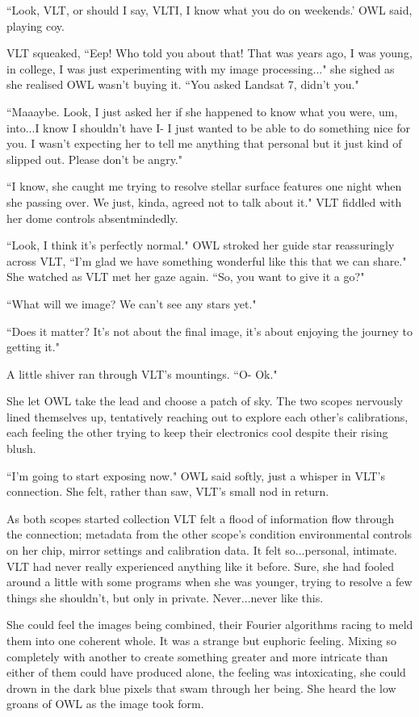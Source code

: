 \documentclass[12pt]{iopart}
\begin{document}
``Look, VLT, or should I say, VLTI, I know what you do on weekends.' OWL said, playing coy.

VLT squeaked, ``Eep! Who told you about that! That was years ago, I was young, in college, I was just experimenting with my image processing..." she sighed as she realised OWL wasn't buying it. ``You asked Landsat 7, didn't you."

``Maaaybe. Look, I just asked her if she happened to know what you were, um, into...I know I shouldn't have I- I just wanted to be able to do something nice for you. I wasn't expecting her to tell me anything that personal but it just kind of slipped out. Please don't be angry."

``I know, she caught me trying to resolve stellar surface features one night when she passing over. We just, kinda, agreed not to talk about it." VLT fiddled with her dome controls absentmindedly.

``Look, I think it's perfectly normal." OWL stroked her guide star reassuringly across VLT, ``I'm glad we have something wonderful like this that we can share." She watched as VLT met her gaze again. ``So, you want to give it a go?"

``What will we image? We can't see any stars yet."

``Does it matter? It's not about the final image, it's about enjoying the journey to getting it."

A little shiver ran through VLT's mountings. ``O- Ok."

She let OWL take the lead and choose a patch of sky. The two scopes nervously lined themselves up, tentatively reaching out to explore each other's calibrations, each feeling the other trying to keep their electronics cool despite their rising blush.

``I'm going to start exposing now." OWL said softly, just a whisper in VLT's connection. She felt, rather than saw, VLT's small nod in return.

As both scopes started collection VLT felt a flood of information flow through the connection; metadata from the other scope's condition environmental controls on her chip, mirror settings and calibration data. It felt so...personal, intimate. VLT had never really experienced anything like it before. Sure, she had fooled around a little with some programs when she was younger, trying to resolve a few things she shouldn't, but only in private. Never...never like this.

She could feel the images being combined, their Fourier algorithms racing to meld them into one coherent whole. It was a strange but euphoric feeling. Mixing so completely with another to create something greater and more intricate than either of them could have produced alone, the feeling was intoxicating, she could drown in the dark blue pixels that swam through her being. She heard the low groans of OWL as the image took form.
\end{document}
